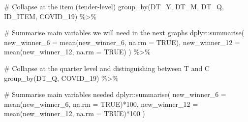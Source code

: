 \documentclass[
]{report}
\newenvironment{Shaded}{\begin{snugshade}}{\end{snugshade}}
\newcommand{\AttributeTok}[1]{\textcolor[rgb]{0.40,0.45,0.13}{#1}}
\newcommand{\CommentTok}[1]{\textcolor[rgb]{0.37,0.37,0.37}{#1}}
\newcommand{\ConstantTok}[1]{\textcolor[rgb]{0.56,0.35,0.01}{#1}}
\newcommand{\DecValTok}[1]{\textcolor[rgb]{0.68,0.00,0.00}{#1}}
\newcommand{\FunctionTok}[1]{\textcolor[rgb]{0.28,0.35,0.67}{#1}}
\newcommand{\NormalTok}[1]{\textcolor[rgb]{0.00,0.23,0.31}{#1}}
\newcommand{\SpecialCharTok}[1]{\textcolor[rgb]{0.37,0.37,0.37}{#1}}
\begin{document}
\begin{Shaded}
\begin{Highlighting}[]
    \CommentTok{\# Collapse at the item (tender{-}level)}
  \FunctionTok{group\_by}\NormalTok{(DT\_Y, DT\_M, DT\_Q, ID\_ITEM, COVID\_19) }\SpecialCharTok{\%\textgreater{}\%} 
  
  \CommentTok{\# Summarise main variables we will need in the next graphs}
\NormalTok{  dplyr}\SpecialCharTok{::}\FunctionTok{summarise}\NormalTok{(}
    \AttributeTok{new\_winner\_6 =} \FunctionTok{mean}\NormalTok{(new\_winner\_6, }\AttributeTok{na.rm =} \ConstantTok{TRUE}\NormalTok{),}
    \AttributeTok{new\_winner\_12 =} \FunctionTok{mean}\NormalTok{(new\_winner\_12, }\AttributeTok{na.rm =} \ConstantTok{TRUE}\NormalTok{)}
\NormalTok{  )   }\SpecialCharTok{\%\textgreater{}\%}

  \CommentTok{\# Collapse at the quarter level and distinguishing between T and C }
  \FunctionTok{group\_by}\NormalTok{(DT\_Q, COVID\_19) }\SpecialCharTok{\%\textgreater{}\%} 
  
  \CommentTok{\# Summarise main variables needed}
\NormalTok{  dplyr}\SpecialCharTok{::}\FunctionTok{summarise}\NormalTok{(}
    \AttributeTok{new\_winner\_6 =} \FunctionTok{mean}\NormalTok{(new\_winner\_6, }\AttributeTok{na.rm =} \ConstantTok{TRUE}\NormalTok{)}\SpecialCharTok{*}\DecValTok{100}\NormalTok{,}
    \AttributeTok{new\_winner\_12 =} \FunctionTok{mean}\NormalTok{(new\_winner\_12, }\AttributeTok{na.rm =} \ConstantTok{TRUE}\NormalTok{)}\SpecialCharTok{*}\DecValTok{100}
\NormalTok{  ) }
\end{Highlighting}
\end{Shaded}

\begin{figure}

\begin{minipage}[t]{\linewidth}

{\centering 


}

\end{minipage}%

\end{figure}

\begin{figure}

\begin{minipage}[t]{\linewidth}

{\centering 


}

\end{minipage}%

\end{figure}
\end{document}
